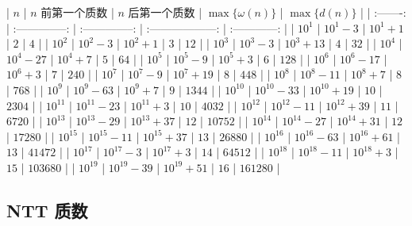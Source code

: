 \documentclass{ctexart}
\begin{document}
|    $n$    | $n$ 前第一个质数 | $n$ 后第一个质数 | $\max\{\omega (n)\}$ | $\max\{d(n)\}$ |
| :-------: | :--------------: | :--------------: | :------------------: | :------------: |
| $10^{1}$  |    $10^{1}-3$    |    $10^{1}+1$    |         $2$          |      $4$       |
| $10^{2}$  |    $10^{2}-3$    |    $10^{2}+1$    |         $3$          |      $12$      |
| $10^{3}$  |    $10^{3}-3$    |   $10^{3}+13$    |         $4$          |      $32$      |
| $10^{4}$  |   $10^{4}-27$    |    $10^{4}+7$    |         $5$          |      $64$      |
| $10^{5}$  |    $10^{5}-9$    |    $10^{5}+3$    |         $6$          |     $128$      |
| $10^{6}$  |   $10^{6}-17$    |    $10^{6}+3$    |         $7$          |     $240$      |
| $10^{7}$  |    $10^{7}-9$    |   $10^{7}+19$    |         $8$          |     $448$      |
| $10^{8}$  |   $10^{8}-11$    |    $10^{8}+7$    |         $8$          |     $768$      |
| $10^{9}$  |   $10^{9}-63$    |    $10^{9}+7$    |         $9$          |     $1344$     |
| $10^{10}$ |   $10^{10}-33$   |   $10^{10}+19$   |         $10$         |     $2304$     |
| $10^{11}$ |   $10^{11}-23$   |   $10^{11}+3$    |         $10$         |     $4032$     |
| $10^{12}$ |   $10^{12}-11$   |   $10^{12}+39$   |         $11$         |     $6720$     |
| $10^{13}$ |   $10^{13}-29$   |   $10^{13}+37$   |         $12$         |    $10752$     |
| $10^{14}$ |   $10^{14}-27$   |   $10^{14}+31$   |         $12$         |    $17280$     |
| $10^{15}$ |   $10^{15}-11$   |   $10^{15}+37$   |         $13$         |    $26880$     |
| $10^{16}$ |   $10^{16}-63$   |   $10^{16}+61$   |         $13$         |    $41472$     |
| $10^{17}$ |   $10^{17}-3$    |   $10^{17}+3$    |         $14$         |    $64512$     |
| $10^{18}$ |   $10^{18}-11$   |   $10^{18}+3$    |         $15$         |    $103680$    |
| $10^{19}$ |   $10^{19}-39$   |   $10^{19}+51$   |         $16$         |    $161280$    |

\subsection{NTT 质数}
\end{document}
